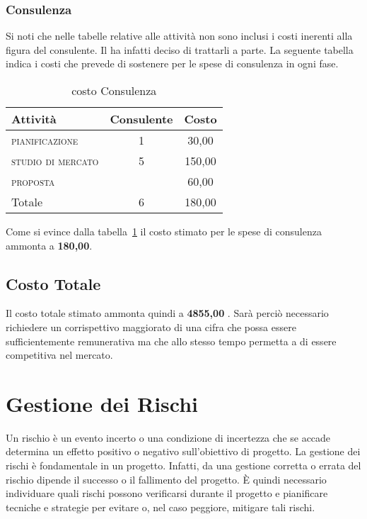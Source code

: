 	
\subsubsection*{Consulenza}

Si noti che nelle tabelle relative alle attività non sono inclusi i costi inerenti alla figura del consulente. Il  ha infatti deciso di trattarli a parte. La seguente tabella indica i costi che \team prevede di sostenere per le spese di consulenza in ogni fase.
	
\begin{table}[!h]
\centering
\begin{tabular}{|l|c|c|}
\hline
\textbf{Attività}& \textbf{Consulente} & \textbf{Costo}  \\           
\hline
\scshape{}pianificazione		& 1& \text{\euro} 30,00 \\
\scshape{}studio di mercato 	& 5& \text{\euro} 150,00 \\
\scshape{}proposta 			& &	\text{\euro} 60,00 \\	
\hline
Totale				& 6& \text{\euro} 180,00 \\	
\hline
\end{tabular}
\caption{costo Consulenza}\label{tab:consulenza}
\end{table}

Come si evince dalla tabella~\ref{tab:consulenza} il costo stimato per le spese di consulenza ammonta a \textbf{\text{\euro} 180,00}.

\subsection{Costo Totale}

Il costo totale stimato ammonta quindi a \textbf	{ \text{\euro} 4855,00 }.
Sarà perciò necessario richiedere un corrispettivo maggiorato di una cifra che possa essere sufficientemente remunerativa ma che allo stesso tempo permetta a \team di essere competitiva nel mercato.


\section{Gestione dei Rischi}
Un rischio è un evento incerto o una condizione di incertezza che se accade determina un effetto positivo o negativo sull'obiettivo di progetto.
La gestione dei rischi è fondamentale in un progetto. Infatti, da una gestione corretta o errata del rischio dipende il successo o il fallimento del progetto.
È quindi necessario individuare quali rischi possono verificarsi durante il progetto e pianificare tecniche e strategie per evitare o, nel caso peggiore, mitigare tali rischi.


